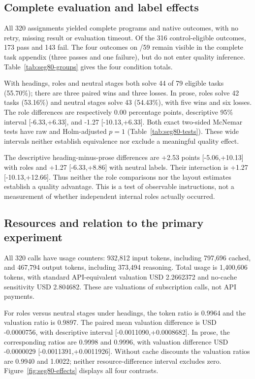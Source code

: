 \subsection{Complete evaluation and label effects}
All 320 assignments yielded complete programs and native outcomes, with no retry, missing result or evaluation timeout. Of the 316 control-eligible outcomes, 173 pass and 143 fail. The four outcomes on /59 remain visible in the complete task appendix (three passes and one failure), but do not enter quality inference. Table~\ref{tab:seg80-groups} gives the four condition totals.


With headings, roles and neutral stages both solve 44 of 79 eligible tasks (55.70\%); there are three paired wins and three losses. In prose, roles solve 42 tasks (53.16\%) and neutral stages solve 43 (54.43\%), with five wins and six losses. The role differences are respectively 0.00 percentage points, descriptive 95\% interval [-6.33,+6.33], and -1.27 [-10.13,+6.33]. Both exact two-sided McNemar tests have raw and Holm-adjusted $p=1$ (Table~\ref{tab:seg80-tests}). These wide intervals neither establish equivalence nor exclude a meaningful quality effect.


The descriptive heading-minus-prose differences are +2.53 points [-5.06,+10.13] with roles and +1.27 [-6.33,+8.86] with neutral labels. Their interaction is +1.27 [-10.13,+12.66]. Thus neither the role comparisons nor the layout estimates establish a quality advantage. This is a test of observable instructions, not a measurement of whether independent internal roles actually occurred.

\subsection{Resources and relation to the primary experiment}
All 320 calls have usage counters: 932,812 input tokens, including 797,696 cached, and 467,794 output tokens, including 373,494 reasoning. Total usage is 1,400,606 tokens, with standard API-equivalent valuation USD 2.2662372 and no-cache sensitivity USD 2.804682. These are valuations of subscription calls, not API payments.

For roles versus neutral stages under headings, the token ratio is 0.9964 and the valuation ratio is 0.9897. The paired mean valuation difference is USD -0.0000756, with descriptive interval [-0.0011090,+0.0008682]. In prose, the corresponding ratios are 0.9998 and 0.9996, with valuation difference USD -0.0000029 [-0.0011391,+0.0011926]. Without cache discounts the valuation ratios are 0.9940 and 1.0022; neither resource-difference interval excludes zero. Figure~\ref{fig:seg80-effects} displays all four contrasts.

